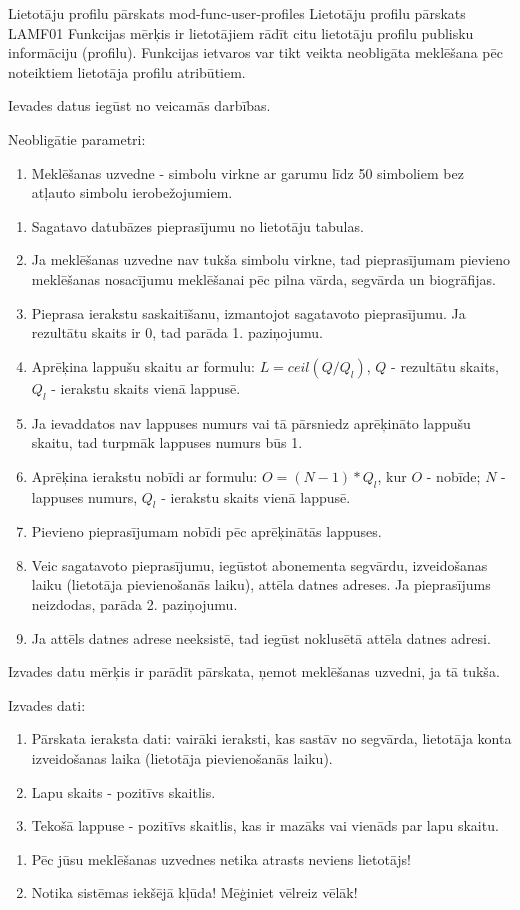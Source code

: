 \moduleFunctionTable
{Lietotāju profilu pārskats}
{mod-func-user-profiles}
{Lietotāju profilu pārskats}
{LAMF01}
{
	Funkcijas mērķis ir lietotājiem rādīt citu lietotāju profilu publisku informāciju (profilu).
	Funkcijas ietvaros var tikt veikta neobligāta meklēšana pēc noteiktiem lietotāja profilu atribūtiem.
}
{
	Ievades datus iegūst no veicamās darbības.

	Neobligātie parametri:
	\begin{enumerate}
		\item Meklēšanas uzvedne - simbolu virkne ar garumu līdz 50 simboliem bez atļauto simbolu ierobežojumiem.
	\end{enumerate}
}
{
	\begin{enumerate}
		\item Sagatavo datubāzes pieprasījumu no lietotāju tabulas.
		\item Ja meklēšanas uzvedne nav tukša simbolu virkne, tad pieprasījumam pievieno meklēšanas nosacījumu meklēšanai pēc pilna vārda, segvārda un biogrāfijas.
		\item Pieprasa ierakstu saskaitīšanu, izmantojot sagatavoto pieprasījumu.
		      Ja rezultātu skaits ir $0$, tad parāda 1. paziņojumu.
		\item Aprēķina lappušu skaitu ar formulu: $L = ceil(Q / Q_l)$, $Q$ - rezultātu skaits, $Q_l$ - ierakstu skaits vienā lappusē.
		\item Ja ievaddatos nav lappuses numurs vai tā pārsniedz aprēķināto lappušu skaitu, tad turpmāk lappuses numurs būs 1.
		\item Aprēķina ierakstu nobīdi ar formulu: $O = (N - 1) * Q_l$, kur $O$ - nobīde; $N$ - lappuses numurs, $Q_l$ - ierakstu skaits vienā lappusē.
		\item Pievieno pieprasījumam nobīdi pēc aprēķinātās lappuses.
		\item Veic sagatavoto pieprasījumu, iegūstot abonementa segvārdu, izveidošanas laiku (lietotāja pievienošanās laiku), attēla datnes adreses.
		      Ja pieprasījums neizdodas, parāda 2. paziņojumu.
		\item Ja attēls datnes adrese neeksistē, tad iegūst noklusētā attēla datnes adresi.
	\end{enumerate}
}
{
	Izvades datu mērķis ir parādīt pārskata, ņemot meklēšanas uzvedni, ja tā tukša.

	Izvades dati:
	\begin{enumerate}
		\item Pārskata ieraksta dati: vairāki ieraksti, kas sastāv no segvārda, lietotāja konta izveidošanas laika (lietotāja pievienošanās laiku).
		\item Lapu skaits - pozitīvs skaitlis.
		\item Tekošā lappuse - pozitīvs skaitlis, kas ir mazāks vai vienāds par lapu skaitu.
	\end{enumerate}
}
{
	\begin{enumerate}
		\item Pēc jūsu meklēšanas uzvednes netika atrasts neviens lietotājs!
		\item Notika sistēmas iekšējā kļūda! Mēģiniet vēlreiz vēlāk!
	\end{enumerate}
}
